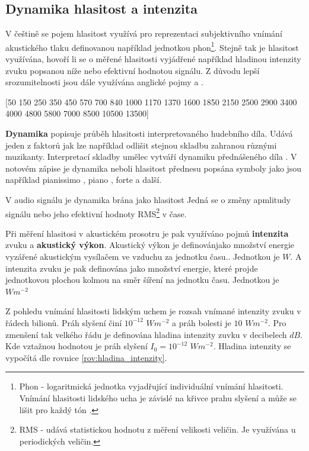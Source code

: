   \subsection{Dynamika hlasitost a intenzita} \label{sec:Dynamika}
  

  V češtině se pojem hlasitost využívá pro reprezentaci subjektivního vnímání akustického tlaku definovanou například jednotkou phon\footnote{Phon - logaritmická jednotka vyjadřující individuální vnímání hlasitosti. Vnímání hlasitosti lidského ucha je závislé na křivce prahu slyšení a může se lišit pro každý tón \cite{tumarkin_1950}.}. 
  Stejně tak je hlasitost využívána, hovoří li se o měřené hlasitosti vyjádřené například hladinou intenzity zvuku popsanou níže nebo efektivní hodnotou signálu.
  Z důvodu lepší srozumitelnosti jsou dále využívána anglické pojmy  a . 

  [50 150 250 350 450 570 700 840 1000 1170 1370 1600 1850 2150 2500 2900 3400 4000 4800 5800 7000 8500 10500 13500] %

  \textbf{Dynamika} popisuje průběh hlasitosti interpretovaného hudebního díla. Udává jeden z faktorů jak lze například odlišit stejnou skladbu zahranou různými muzikanty. Interpretací skladby umělec vytváří dynamiku přednášeného díla \cite{fundamental_of_music_processing}.
  V notovém zápise je dynamika neboli hlasitost přednesu popsána symboly jako jsou například pianissimo , piano , forte  a další.

  V audio signálu je dynamika brána jako hlasitost  Jedná se o změny apmlitudy signálu nebo jeho efektivní hodnoty \acs{RMS}\footnote{RMS - udává statistickou hodnotu z měření velikosti veličin. Je využívána u periodických veličin\cite{RMS_value}.} v čase.

  Při měření hlasitosi  v akustickém prosotru je pak využíváno pojmů \textbf{intenzita} zvuku a \textbf{akustický výkon}.
  Akustický výkon je definovánjako množství energie  vyzářené akustickým vysílačem ve vzduchu za jednotku času.\cite{acoustic_power}. Jednotkou je $W$.
  A intenzita zvuku je pak definována jako množství energie, které projde jednotkovou plochou kolmou na směr šíření na jednotku času. Jednotkou je $Wm^{-2}$ \cite{intenzita_zvuku_definice}
  
  Z pohledu vnímání hlasitosti lidským uchem je rozsah vnímané intenzity zvuku v řádech bilionů. Práh slyšení činí $10^{-12}$ $Wm^{-2}$ a práh bolesti je $10$ $Wm^{-2}$.
  Pro zmenšení tak velkého řádu je definována hladina intenzity zuvku v decibelech $dB$. Kde vztažnou hodnotou je práh slyšení $I_0 = 10^{-12}$ $Wm^{-2}$.
  Hladina intenzity se vypočítá dle rovnice \ref{rov:hladina_intenzity}.


